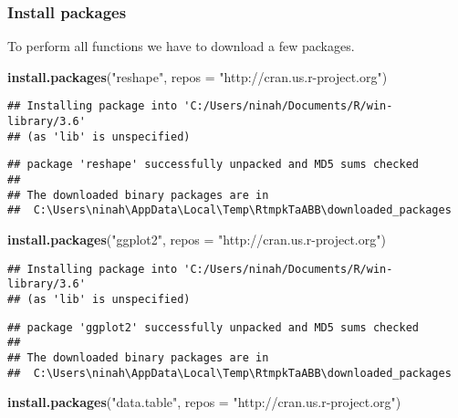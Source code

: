 \documentclass[]{article}
\newenvironment{Shaded}{\begin{snugshade}}{\end{snugshade}}
\newcommand{\DataTypeTok}[1]{\textcolor[rgb]{0.13,0.29,0.53}{#1}}
\newcommand{\KeywordTok}[1]{\textcolor[rgb]{0.13,0.29,0.53}{\textbf{#1}}}
\newcommand{\NormalTok}[1]{#1}
\newcommand{\StringTok}[1]{\textcolor[rgb]{0.31,0.60,0.02}{#1}}
\begin{document}
\hypertarget{install-packages}{%
\subsubsection{Install packages}\label{install-packages}}

To perform all functions we have to download a few packages.

\begin{Shaded}
\begin{Highlighting}[]
\KeywordTok{install.packages}\NormalTok{(}\StringTok{"reshape"}\NormalTok{, }\DataTypeTok{repos =} \StringTok{"http://cran.us.r-project.org"}\NormalTok{)}
\end{Highlighting}
\end{Shaded}

\begin{verbatim}
## Installing package into 'C:/Users/ninah/Documents/R/win-library/3.6'
## (as 'lib' is unspecified)
\end{verbatim}

\begin{verbatim}
## package 'reshape' successfully unpacked and MD5 sums checked
## 
## The downloaded binary packages are in
##  C:\Users\ninah\AppData\Local\Temp\RtmpkTaABB\downloaded_packages
\end{verbatim}

\begin{Shaded}
\begin{Highlighting}[]
\KeywordTok{install.packages}\NormalTok{(}\StringTok{"ggplot2"}\NormalTok{, }\DataTypeTok{repos =} \StringTok{"http://cran.us.r-project.org"}\NormalTok{)}
\end{Highlighting}
\end{Shaded}

\begin{verbatim}
## Installing package into 'C:/Users/ninah/Documents/R/win-library/3.6'
## (as 'lib' is unspecified)
\end{verbatim}

\begin{verbatim}
## package 'ggplot2' successfully unpacked and MD5 sums checked
## 
## The downloaded binary packages are in
##  C:\Users\ninah\AppData\Local\Temp\RtmpkTaABB\downloaded_packages
\end{verbatim}

\begin{Shaded}
\begin{Highlighting}[]
\KeywordTok{install.packages}\NormalTok{(}\StringTok{"data.table"}\NormalTok{, }\DataTypeTok{repos =} \StringTok{"http://cran.us.r-project.org"}\NormalTok{)}
\end{Highlighting}
\end{Shaded}
\end{document}
